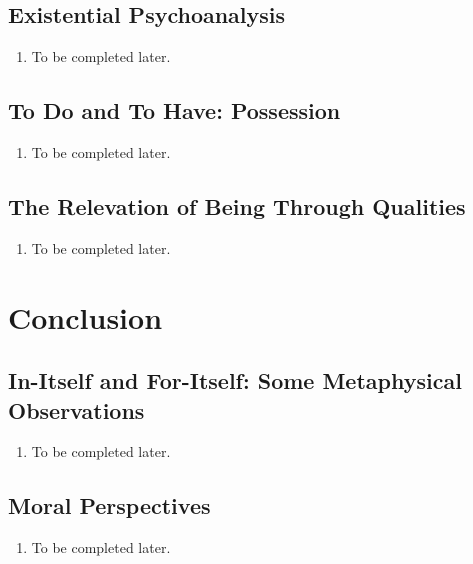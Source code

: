 \subsection{Existential Psychoanalysis}

\begin{enumerate}
  \item To be completed later.
\end{enumerate}

\subsection{To Do and To Have: Possession}

\begin{enumerate}
  \item To be completed later.
\end{enumerate}

\subsection{The Relevation of Being Through Qualities}

\begin{enumerate}
  \item To be completed later.
\end{enumerate}

\section{Conclusion}

\subsection{In-Itself and For-Itself: Some Metaphysical Observations}

\begin{enumerate}
  \item To be completed later.
\end{enumerate}

\subsection{Moral Perspectives}

\begin{enumerate}
  \item To be completed later.
\end{enumerate}

